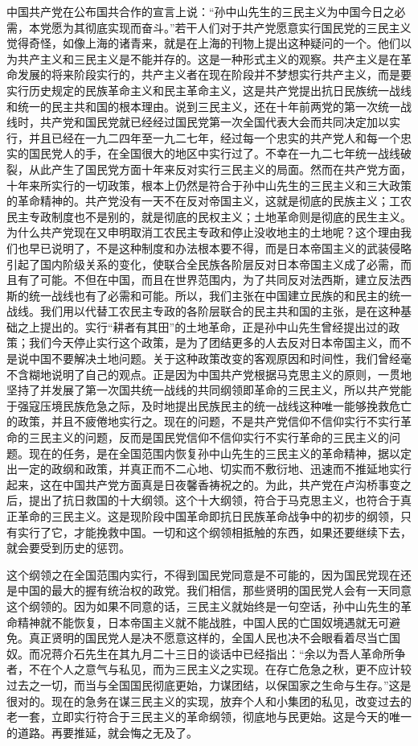 中国共产党在公布国共合作的宣言上说：“孙中山先生的三民主义为中国今日之必需，本党愿为其彻底实现而奋斗。”若干人们对于共产党愿意实行国民党的三民主义觉得奇怪，如像上海的诸青来，就是在上海的刊物上提出这种疑问的一个。他们以为共产主义和三民主义是不能并存的。这是一种形式主义的观察。共产主义是在革命发展的将来阶段实行的，共产主义者在现在阶段并不梦想实行共产主义，而是要实行历史规定的民族革命主义和民主革命主义，这是共产党提出抗日民族统一战线和统一的民主共和国的根本理由。说到三民主义，还在十年前两党的第一次统一战线时，共产党和国民党就已经经过国民党第一次全国代表大会而共同决定加以实行，并且已经在一九二四年至一九二七年，经过每一个忠实的共产党人和每一个忠实的国民党人的手，在全国很大的地区中实行过了。不幸在一九二七年统一战线破裂，从此产生了国民党方面十年来反对实行三民主义的局面。然而在共产党方面，十年来所实行的一切政策，根本上仍然是符合于孙中山先生的三民主义和三大政策的革命精神的。共产党没有一天不在反对帝国主义，这就是彻底的民族主义；工农民主专政制度也不是别的，就是彻底的民权主义；土地革命则是彻底的民生主义。为什么共产党现在又申明取消工农民主专政和停止没收地主的土地呢？这个理由我们也早已说明了，不是这种制度和办法根本要不得，而是日本帝国主义的武装侵略引起了国内阶级关系的变化，使联合全民族各阶层反对日本帝国主义成了必需，而且有了可能。不但在中国，而且在世界范围内，为了共同反对法西斯，建立反法西斯的统一战线也有了必需和可能。所以，我们主张在中国建立民族的和民主的统一战线。我们用以代替工农民主专政的各阶层联合的民主共和国的主张，是在这种基础之上提出的。实行“耕者有其田”的土地革命，正是孙中山先生曾经提出过的政策；我们今天停止实行这个政策，是为了团结更多的人去反对日本帝国主义，而不是说中国不要解决土地问题。关于这种政策改变的客观原因和时间性，我们曾经毫不含糊地说明了自己的观点。正是因为中国共产党根据马克思主义的原则，一贯地坚持了并发展了第一次国共统一战线的共同纲领即革命的三民主义，所以共产党能于强寇压境民族危急之际，及时地提出民族民主的统一战线这种唯一能够挽救危亡的政策，并且不疲倦地实行之。现在的问题，不是共产党信仰不信仰实行不实行革命的三民主义的问题，反而是国民党信仰不信仰实行不实行革命的三民主义的问题。现在的任务，是在全国范围内恢复孙中山先生的三民主义的革命精神，据以定出一定的政纲和政策，并真正而不二心地、切实而不敷衍地、迅速而不推延地实行起来，这在中国共产党方面真是日夜馨香祷祝之的。为此，共产党在卢沟桥事变之后，提出了抗日救国的十大纲领。这个十大纲领，符合于马克思主义，也符合于真正革命的三民主义。这是现阶段中国革命即抗日民族革命战争中的初步的纲领，只有实行了它，才能挽救中国。一切和这个纲领相抵触的东西，如果还要继续下去，就会要受到历史的惩罚。

这个纲领之在全国范围内实行，不得到国民党同意是不可能的，因为国民党现在还是中国的最大的握有统治权的政党。我们相信，那些贤明的国民党人会有一天同意这个纲领的。因为如果不同意的话，三民主义就始终是一句空话，孙中山先生的革命精神就不能恢复，日本帝国主义就不能战胜，中国人民的亡国奴境遇就无可避免。真正贤明的国民党人是决不愿意这样的，全国人民也决不会眼看着尽当亡国奴。而况蒋介石先生在其九月二十三日的谈话中已经指出：“余以为吾人革命所争者，不在个人之意气与私见，而为三民主义之实现。在存亡危急之秋，更不应计较过去之一切，而当与全国国民彻底更始，力谋团结，以保国家之生命与生存。”这是很对的。现在的急务在谋三民主义的实现，放弃个人和小集团的私见，改变过去的老一套，立即实行符合于三民主义的革命纲领，彻底地与民更始。这是今天的唯一的道路。再要推延，就会悔之无及了。

